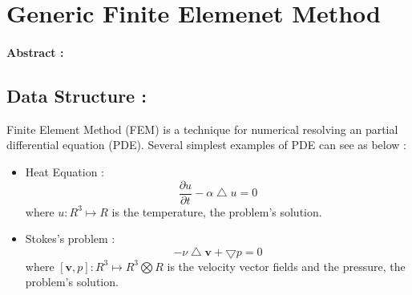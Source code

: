 \documentclass[a4paper,10pt]{article}
\begin{document}
\section{Generic Finite Elemenet Method}

\paragraph{Abstract : }

\subsection{Data Structure : }
Finite Element Method (FEM) is a technique for numerical resolving an partial differential equation (PDE). Several simplest examples of PDE can see as below : 
\begin{itemize}
 \item Heat Equation : \[ \frac{\partial u}{\partial t} - \alpha \bigtriangleup u = 0 \]
where $u : R^{3} \mapsto R $ is the temperature, the problem's solution.
 \item Stokes's problem :   \[ - \nu \bigtriangleup \textbf{v} + \bigtriangledown p = 0 \]
where $[\textbf{v},p] : R^{3} \mapsto R^{3}\bigotimes R $ is the velocity vector fields and the pressure, the problem's solution.
\end{itemize}
\end{document}
